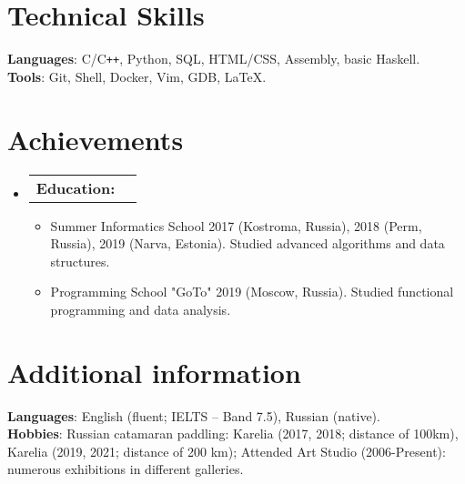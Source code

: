 \documentclass[letterpaper,11pt]{article}
\makeatletter
\newcommand{\resumeItem}[1]{
  \item\small{
    {#1 \vspace{-2pt}}
  }
}
\newcommand{\resumeProjectHeading}[2]{
    \item
    \begin{tabular*}{0.97\textwidth}{l@{\extracolsep{\fill}}r}
      \small#1 & \small#2 \\
    \end{tabular*}\vspace{-7pt}
}
\newcommand{\resumeSubHeadingListStart}{\begin{itemize}[leftmargin=0.15in, label={}]}
\newcommand{\resumeSubHeadingListEnd}{\end{itemize}\vspace{-13pt}}
\newcommand{\resumeItemListStart}{\begin{itemize}[leftmargin=0.15in]}
\newcommand{\resumeItemListEnd}{\end{itemize}\vspace{-5pt}}
\makeatother
\begin{document}
\section{Technical Skills}
\begin{itemize}[leftmargin=0.15in, label={}]
    \small{\item{
     \textbf{Languages}{: C/C\texttt{++}, Python, SQL, HTML/CSS, Assembly, basic Haskell.} \\
     \textbf{Tools}{: Git, Shell, Docker, Vim, GDB, LaTeX.} \\
    }}
\end{itemize}
\vspace{-16pt}
%
\section{Achievements}
    \resumeSubHeadingListStart
        \resumeProjectHeading
            {\textbf{Education: }}{}
            \resumeItemListStart
                \resumeItem{Summer Informatics School 2017 (Kostroma, Russia), 2018 (Perm, Russia), 2019 (Narva, Estonia). Studied advanced algorithms and data structures.}
                \resumeItem{Programming School "GoTo" 2019 (Moscow, Russia). Studied functional programming and data analysis.}
            \resumeItemListEnd
    \resumeSubHeadingListEnd



\section{Additional information}
\begin{itemize}[leftmargin=0.15in, label={}]
    \small{\item{
     \textbf{Languages}{: English (fluent; IELTS -- Band 7.5), Russian (native).} \\
     \textbf{Hobbies}{: Russian catamaran paddling: Karelia (2017, 2018; distance of 100km), Karelia (2019, 2021; distance of 200 km); Attended Art Studio (2006-Present): numerous exhibitions in different galleries.} \\
    }}
\end{itemize}
\end{document}
